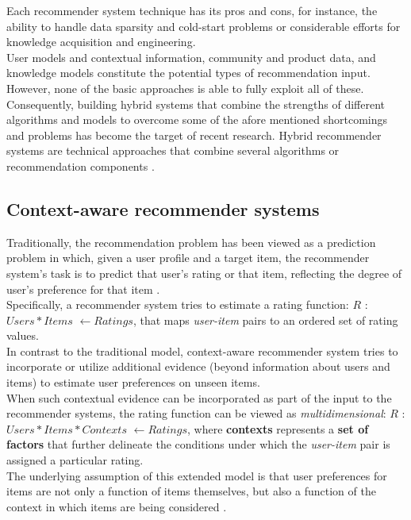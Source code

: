 Each recommender system technique has its pros and cons, for
instance, the ability to handle data sparsity and cold-start problems
or considerable efforts for knowledge acquisition and engineering. \\
User models and contextual information, community and product data,
and knowledge models constitute the potential types of recommendation
input. However, none of the basic approaches is able to fully exploit
all of these. Consequently, building hybrid systems that combine the
strengths of different algorithms and models to overcome some of the
afore mentioned shortcomings and problems has become the target of
recent research. Hybrid recommender systems are technical approaches
that combine several algorithms or recommendation components
\cite{jannach2010recommender}.

\subsection{Context-aware recommender systems}

Traditionally, the recommendation problem has been viewed as a
prediction problem in which, given a user profile and a target item,
the recommender system's task is to predict that user's rating or that
item, reflecting the degree of user's preference for that item \cite{jannach2010recommender}. \\
Specifically, a recommender system tries to estimate a rating
function: $R$ : $Users * Items$ $ \leftarrow Ratings$, that maps
\textit{user-item} pairs to an ordered  set of rating values.\\
In contrast to the traditional model, context-aware recommender system
tries to incorporate or utilize additional evidence (beyond
information about users and items) to estimate user preferences on
unseen items.\\ When such contextual evidence can be incorporated as
part of the input to the recommender systems, the rating function can
be viewed as \textit{multidimensional}: $R$ : $Users * Items *
Contexts$ $ \leftarrow Ratings$, where \textbf{contexts} represents a
\textbf{set of factors} that further delineate the conditions under which the
\textit{user-item} pair is assigned a particular rating. \\ The
underlying assumption of this extended model is that user preferences
for items are not only a function of items themselves, but also a
function of the context in which items are being
considered \cite{lim2009assessing}. 

